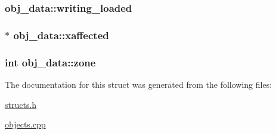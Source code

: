 \hypertarget{structobj__data_ab399ea8402c4d191ea5ecbed71b1b115}{
\subsubsection[{writing\-\_\-loaded}]{ obj\-\_\-data\-::writing\-\_\-loaded}}\label{structobj__data_ab399ea8402c4d191ea5ecbed71b1b115}
\hypertarget{structobj__data_a4bfd45954d19b332a63708fbced73edd}{
\subsubsection[{xaffected}]{$\ast$ obj\-\_\-data\-::xaffected}}\label{structobj__data_a4bfd45954d19b332a63708fbced73edd}
\hypertarget{structobj__data_ada72f4e7a40147ab161250ee1843a125}{
\subsubsection[{zone}]{\setlength{\rightskip}{0pt plus 5cm}int obj\-\_\-data\-::zone}}\label{structobj__data_ada72f4e7a40147ab161250ee1843a125}


The documentation for this struct was generated from the following files\-:\begin{DoxyCompactItemize}
\item 
\hyperlink{structs_8h}{structs.\-h}\item 
\hyperlink{objects_8cpp}{objects.\-cpp}\end{DoxyCompactItemize}
